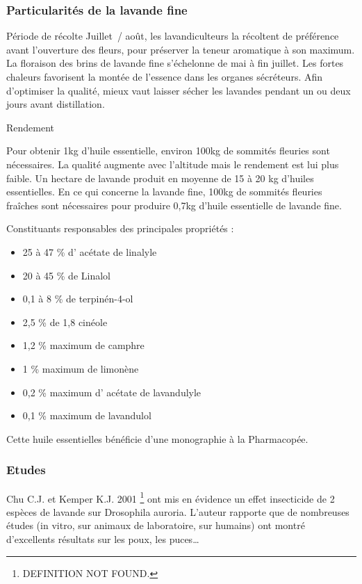 \documentclass[12pt,a4wide]{article}
\begin{document}
\subsubsection{Particularités de la lavande fine}
\label{sec-4-7-3}

 Période de récolte
Juillet / août, les lavandiculteurs la récoltent de préférence avant l'ouverture des fleurs, pour préserver la teneur aromatique à son maximum. La floraison des brins de lavande fine s'échelonne de mai à fin juillet. Les fortes chaleurs favorisent la montée de l'essence dans les organes sécréteurs. Afin d'optimiser la qualité, mieux vaut laisser sécher les lavandes pendant un ou deux jours avant distillation.

Rendement

Pour obtenir 1kg d'huile essentielle, environ 100kg de sommités fleuries sont nécessaires. La qualité augmente avec l'altitude mais le rendement est lui plus faible. Un hectare de lavande produit en moyenne de 15 à 20 kg d'huiles essentielles. En ce qui concerne la lavande fine, 100kg de sommités fleuries fraîches sont nécessaires pour produire 0,7kg d'huile essentielle de lavande fine.

Constituants responsables des principales propriétés :

\begin{itemize}
\item 25 à 47 \% d' acétate de linalyle
\item 20 à 45 \% de Linalol
\item 0,1 à 8 \% de terpinén-4-ol
\item 2,5 \% de 1,8 cinéole
\item 1,2 \% maximum de camphre
\item 1 \% maximum de limonène
\item 0,2 \% maximum d' acétate de lavandulyle
\item 0,1 \% maximum de lavandulol
\end{itemize}

Cette huile essentielles bénéficie d'une monographie à la  Pharmacopée.

\subsubsection{Etudes}
\label{sec-4-7-4}

Chu C.J. et Kemper K.J. 2001 \footnote{DEFINITION NOT FOUND.} ont mis en évidence un effet insecticide de 2 espèces de lavande sur Drosophila auroria. L'auteur rapporte que de nombreuses études (in vitro, sur animaux de laboratoire, sur humains) ont montré d'excellents résultats sur les poux, les puces…
\end{document}

